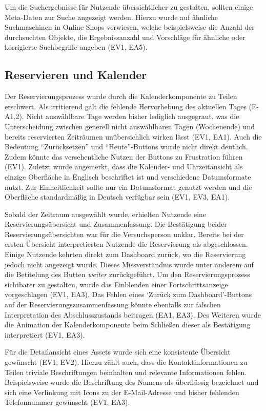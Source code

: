 Um die Suchergebnisse für Nutzende übersichtlicher zu gestalten, sollten einige Meta-Daten zur
Suche angezeigt werden. Hierzu wurde auf ähnliche Suchmaschinen in Online-Shops verwiesen, welche
beispielsweise die Anzahl der durchsuchten Objekte, die Ergebnissanzahl und Vorschläge für ähnliche
oder korrigierte Suchbegriffe angeben (EV1, EA5). 

\subsection{Reservieren und Kalender}
Der Reservierungsprozess wurde durch die Kalenderkomponente zu Teilen erschwert. Als irritierend
galt die fehlende Hervorhebung des aktuellen Tages (E-A1,2). Nicht auswählbare Tage werden bisher
lediglich ausgegraut, was die Unterscheidung zwischen generell nicht auswählbaren Tagen (Wochenende)
und bereits reservierten Zeiträumen unübersichlich wirken lässt (EV1, EA1). Auch die Bedeutung
\enquote{Zurücksetzen} und \enquote{Heute}-Buttons wurde nicht direkt deutlich. Zudem könnte das
versehentliche Nutzen der Buttons zu Frustration führen (EV1). Zuletzt wurde angemerkt, dass die
Kalender- und Uhrzeitansicht als einzige Oberfläche in Englisch beschriftet ist und verschiedene
Datumsformate nutzt. Zur Einheitlichkeit sollte nur ein Datumsformat genutzt werden und die
Oberfläche standardmäßig in Deutsch verfügbar sein (EV1, EV3, EA1). 

Sobald der Zeitraum ausgewählt wurde, erhielten Nutzende eine Reservierungsübersicht und
Zusammenfassung. Die Bestätigung beider Reservierungsübersichten war für die Versuchsperson unklar.
Bereits bei der ersten Übersicht interpretierten Nutzende die Reservierung als abgeschlossen. Einige
Nutzende kehrten direkt zum Dashboard zurück, wo die Reservierung jedoch nicht angezeigt wurde.
Dieses Missverständnis wurde unter anderem auf die Betitelung des Butten \textit{weiter}
zurückgeführt. Um den Reservierungsprozess sichtbarer zu gestalten, wurde das Einblenden einer
Fortschrittsanzeige vorgeschlagen (EV1, EA3). Das Fehlen eines \enquote*{Zurück zum Dashboard}-Buttons
auf der Reservierungszusammenfassung könnte ebenfalls zur falschen Interpretation des
Abschlusszustands beitragen (EA1, EA3). Des Weiteren wurde die Animation der Kalenderkomponente beim
Schließen dieser als Bestätigung interpretiert (EV1, EA3).

Für die Detailansicht eines Assets wurde sich eine konsistente Übersicht gewünscht (EV1, EV2).
Hierzu zählt auch, dass die Kontaktinformationen zu Teilen triviale Beschriftungen beinhalten und
relevante Informationen fehlen. Beispielsweise wurde die Beschriftung des Namens als überflüssig
bezeichnet und sich eine Verlinkung mit Icons zu der E-Mail-Adresse und bisher fehlenden
Telefonnummer gewünscht (EV1, EA3).

